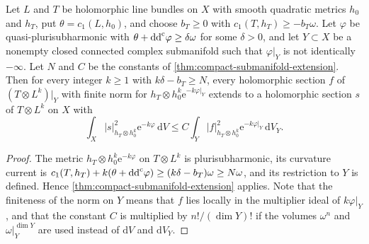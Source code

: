 \begin{corollary}\label{cor:compact-positive-metric-extension}
Let $L$ and $T$ be holomorphic line bundles on $X$ with smooth quadratic metrics $h_0$ and $h_T$, put $\theta=c_1(L,h_0)$, and choose $b_T\geq0$ with $c_1(T,h_T)\geq-b_T\omega$. Let $\varphi$ be quasi-plurisubharmonic with $\theta+\mathrm{dd}^{\mathrm{c}}\varphi\geq\delta\omega$ for some $\delta>0$, and let $Y\subset X$ be a nonempty closed connected complex submanifold such that $\varphi|_Y$ is not identically $-\infty$. Let $N$ and $C$ be the constants of \cref{thm:compact-submanifold-extension}. Then for every integer $k\geq1$ with $k\delta-b_T\geq N$, every holomorphic section $f$ of $(T\otimes L^k)|_Y$ with finite norm for $h_T\otimes h_0^k\mathrm e^{-k\varphi|_Y}$ extends to a holomorphic section $s$ of $T\otimes L^k$ on $X$ with
\[
 \int_X|s|_{h_T\otimes h_0^k}^2\mathrm e^{-k\varphi}\,\mathrm dV
       \leq C\int_Y|f|_{h_T\otimes h_0^k}^2
                         \mathrm e^{-k\varphi|_Y}\,\mathrm dV_Y.
\]
\end{corollary}
\begin{proof}
The metric $h_T\otimes h_0^k\mathrm e^{-k\varphi}$ on $T\otimes L^k$ is plurisubharmonic, its curvature current is $c_1(T,h_T)+k(\theta+\mathrm{dd}^{\mathrm{c}}\varphi)\geq(k\delta-b_T)\omega\geq N\omega$, and its restriction to $Y$ is defined. Hence \cref{thm:compact-submanifold-extension} applies. Note that the finiteness of the norm on $Y$ means that $f$ lies locally in the multiplier ideal of $k\varphi|_Y$, and that the constant $C$ is multiplied by $n!/(\dim Y)!$ if the volumes $\omega^n$ and $\omega|_Y^{\dim Y}$ are used instead of $\mathrm dV$ and $\mathrm dV_Y$.
\end{proof}





